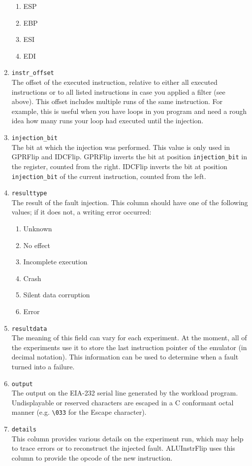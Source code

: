 \documentclass[a4paper,10pt]{article}
\begin{document}
\begin{enumerate}
\begin{enumerate}
        \item ESP
        \item EBP
        \item ESI
        \item EDI
       \end{enumerate}
 \item \verb+instr_offset+\\
       The offset of the executed instruction, relative to either all executed
       instructions or to all listed instructions in case you applied
       a filter (see above). This offset includes multiple runs of the same
       instruction.
       For example, this is useful when you have loops in you program and
       need a rough idea how many runs your loop had executed until
       the injection.
 \item \verb+injection_bit+\\
       The bit at which the injection was performed. This value is
       only used in GPRFlip and IDCFlip. GPRFlip inverts the bit at
       position \verb+injection_bit+ in the register, counted from the right.
       IDCFlip inverts the bit at position \verb+injection_bit+
       of the current instruction, counted from the left.    
 \item \verb+resulttype+\\
       The result of the fault injection.
       This column should have one of the following values;
       if it does not, a writing error occurred:
       \begin{enumerate}
        \item Unknown
        \item No effect
        \item Incomplete execution
        \item Crash
        \item Silent data corruption
        \item Error
       \end{enumerate}
 \item \verb+resultdata+\\
       The meaning of this field can vary for each experiment. At the moment,
       all of the experiments use it to store the last instruction
       pointer of the emulator (in decimal notation).
       This information can be used to determine when a fault
       turned into a failure.
 \item \verb+output+\\
       The output on the EIA-232 serial line generated by the workload
       program. Undisplayable or reserved characters are escaped in a
       C conformant octal manner (e.g. \verb+\033+ for the Escape character).
 \item \verb+details+\\
       This column provides various details on the experiment run,
       which may help to
       trace errors or to reconstruct the injected fault.
       ALUInstrFlip uses this column to
       provide the opcode of the new instruction.
\end{enumerate}
\end{document}

